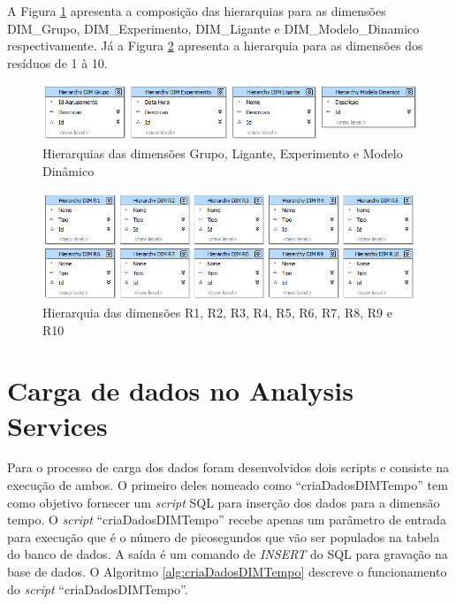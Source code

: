 \newpage

A Figura \ref{fig:hierarGrupoLiganteExperimentoModelo} apresenta a composição das hierarquias para as dimensões DIM\_Grupo, DIM\_Experimento, DIM\_Ligante e DIM\_Modelo\_Dinamico respectivamente. Já a Figura \ref{fig:HierarR1ateR10} apresenta a hierarquia para as dimensões dos resíduos de 1 à 10.

\begin{figure}[h]
        \center
        \includegraphics[scale=0.6]{images/Hierar_Grupo_Ligante_Experimento_Modelo.png}
        \caption{Hierarquias das dimensões Grupo, Ligante, Experimento e Modelo Dinâmico}
        \label{fig:hierarGrupoLiganteExperimentoModelo}
\end{figure}

\begin{figure}[h]
        \center
        \includegraphics[scale=0.6]{images/Hierar_DIMR1_ate_10.png}
        \caption{Hierarquia das dimensões R1, R2, R3, R4, R5, R6, R7, R8, R9 e R10}
        \label{fig:HierarR1ateR10}
\end{figure}	

\section{Carga de dados no Analysis Services}
\label{sec:CargaDeDadosNoAnalysisServices}

Para o processo de carga dos dados foram desenvolvidos dois scripts e consiste na execução de ambos. O primeiro deles nomeado como ``criaDadosDIMTempo'' tem como objetivo fornecer um \emph{script} SQL para inserção dos dados para a dimensão tempo. O \emph{script} ``criaDadosDIMTempo'' recebe apenas um parâmetro de entrada para execução que é o número de picosegundos que vão ser populados na tabela do banco de dados. A saída é um comando de \emph{INSERT} do SQL para gravação na base de dados. O Algoritmo \ref{alg:criaDadosDIMTempo} descreve o funcionamento do \emph{script} ``criaDadosDIMTempo''. 

